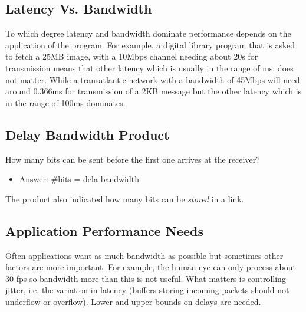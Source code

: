 \documentclass[11pt]{article}
\begin{document}
\subsection{Latency Vs. Bandwidth}
\label{sec:org176c629}
To which degree latency and bandwidth dominate performance depends on the application of the program.
For example, a digital library program that is asked to fetch a 25MB image, with a 10Mbps channel needing about 20s for transmission means that other latency which is usually in the range of ms, does not matter.
While a transatlantic network with a bandwidth of 45Mbps will need around 0.366ms for transmission of a 2KB message but the other latency which is in the range of 100ms dominates.

\subsection{Delay \texttimes{} Bandwidth Product}
\label{sec:org0c5e0c8}
How many bits can be sent before the first one arrives at the receiver?
\begin{itemize}
\item Answer: \#bits = dela \texttimes{} bandwidth
\end{itemize}
The product also indicated how many bits can be \emph{stored} in a link.

\subsection{Application Performance Needs}
\label{sec:org0cd8106}
Often applications want as much bandwidth as possible but sometimes other factors are more important.
For example, the human eye can only process about 30 fps so bandwidth more than this is not useful.
What matters is controlling jitter, i.e. the variation in latency (buffers storing incoming packets should not underflow or overflow).
Lower and upper bounds on delays are needed.
\end{document}
